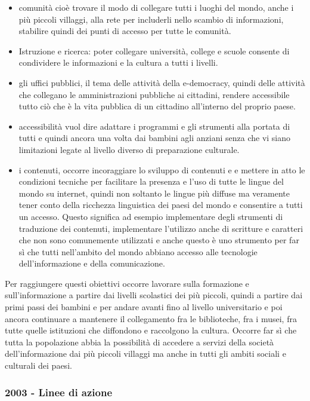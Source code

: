 \begin{itemize}
    \item comunità cioè trovare il modo di collegare tutti i luoghi del mondo, anche i più piccoli villaggi, alla rete per includerli nello scambio di informazioni, stabilire quindi dei punti di accesso per tutte le comunità.
    \item Istruzione e ricerca: poter collegare università, college e scuole consente di condividere le informazioni e la cultura a tutti i livelli. 
    \item gli uffici pubblici, il tema delle attività della e-democracy, quindi delle attività che collegano le amministrazioni pubbliche ai cittadini, rendere accessibile tutto ciò che è la vita pubblica di un cittadino all'interno del proprio paese.
    \item accessibilità vuol dire adattare i programmi e gli strumenti alla portata di tutti e quindi ancora una volta dai bambini agli anziani senza che vi siano limitazioni legate al livello diverso di preparazione culturale.
    \item i contenuti, occorre incoraggiare lo sviluppo di contenuti e e mettere in atto le condizioni tecniche per facilitare la presenza e l'uso di tutte le lingue del mondo su internet, quindi non soltanto le lingue più diffuse ma veramente tener conto della ricchezza linguistica dei paesi del mondo e consentire a tutti un accesso. Questo significa ad esempio implementare degli strumenti di traduzione dei contenuti, implementare l'utilizzo anche di scritture e caratteri che non sono comunemente utilizzati e anche questo è uno strumento per far sì che tutti nell'ambito del mondo abbiano accesso alle tecnologie dell'informazione e della comunicazione.
\end{itemize}

Per raggiungere questi obiettivi occorre lavorare sulla formazione e sull'informazione a partire dai livelli scolastici dei più piccoli, quindi a partire dai primi passi dei bambini e per andare avanti fino al livello universitario e poi ancora continuare a mantenere il collegamento fra le biblioteche, fra i musei, fra tutte quelle istituzioni che diffondono e raccolgono la cultura. 
Occorre far sì che tutta la popolazione abbia la possibilità di accedere a servizi della società dell'informazione dai più piccoli villaggi ma anche in tutti gli ambiti sociali e culturali dei paesi. 

\subsubsection{2003 - Linee di azione}

